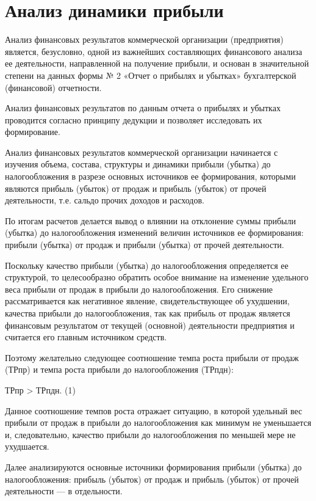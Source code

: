 \section{Анализ динамики прибыли}

Анализ финансовых результатов коммерческой организации (предприятия) является, безусловно, одной из важнейших составляющих финансового анализа ее деятельности, направленной на получение прибыли, и основан в значительной степени на данных формы № 2 «Отчет о прибылях и убытках» бухгалтерской (финансовой) отчетности.

Анализ финансовых результатов по данным отчета о прибылях и убытках проводится согласно принципу дедукции и позволяет исследовать их формирование.

Анализ финансовых результатов коммерческой организации начинается с изучения объема, состава, структуры и динамики прибыли (убытка) до налогообложения в разрезе основных источников ее формирования, которыми являются прибыль (убыток) от продаж и прибыль (убыток) от прочей деятельности, т.е. сальдо прочих доходов и расходов.

По итогам расчетов делается вывод о влиянии на отклонение суммы прибыли (убытка) до налогообложения изменений величин источников ее формирования: прибыли (убытка) от продаж и прибыли (убытка) от прочей деятельности.

Поскольку качество прибыли (убытка) до налогообложения определяется ее структурой, то целесообразно обратить особое внимание на изменение удельного веса прибыли от продаж в прибыли до налогообложения. Его снижение рассматривается как негативное явление, свидетельствующее об ухудшении, качества прибыли до налогообложения, так как прибыль от продаж является финансовым результатом от текущей (основной) деятельности предприятия и считается его главным источником средств.

Поэтому желательно следующее соотношение темпа роста прибыли от продаж (ТРпр) и темпа роста прибыли до налогообложения (ТРпдн):

ТРпр > ТРпдн.        (1)

Данное соотношение темпов роста отражает ситуацию, в которой удельный вес прибыли от продаж в прибыли до налогообложения как минимум не уменьшается и, следовательно, качество прибыли до налогообложения по меньшей мере не ухудшается.

Далее анализируются основные источники формирования прибыли (убытка) до налогообложения: прибыль (убыток) от продаж и прибыль (убыток) от прочей деятельности — в отдельности.

